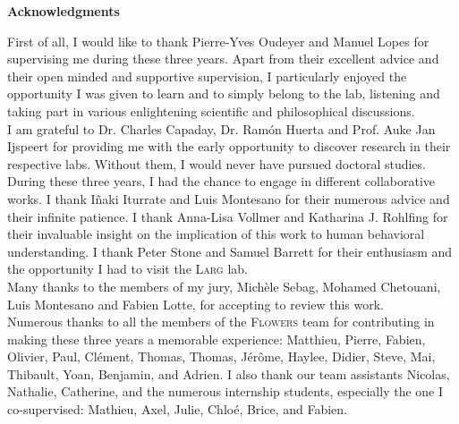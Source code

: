 
\begin{vcenterpage}
\begin{center}
{\large\textbf{Acknowledgments\\}}
\end{center}



\noindent First of all, I would like to thank Pierre-Yves Oudeyer and Manuel Lopes for supervising me during these three years. Apart from their excellent advice and their open minded and supportive supervision, I particularly enjoyed the opportunity I was given to learn and to simply belong to the lab, listening and taking part in various enlightening scientific and philosophical discussions.\\

\noindent I am grateful to Dr. Charles Capaday, Dr. Ram\'{o}n Huerta and Prof. Auke Jan Ijspeert for providing me with the early opportunity to discover research in their respective labs. Without them, I would never have pursued doctoral studies.\\

\noindent During these three years, I had the chance to engage in different collaborative works. I thank I{\~n}aki Iturrate and Luis Montesano for their numerous advice and their infinite patience. I thank Anna-Lisa Vollmer and Katharina J. Rohlfing for their invaluable insight on the implication of this work to human behavioral understanding. I thank Peter Stone and Samuel Barrett for their enthusiasm and the opportunity I had to visit the \textsc{Larg} lab.\\

\noindent Many thanks to the members of my jury, Mich\`ele Sebag, Mohamed Chetouani, Luis Montesano and Fabien Lotte, for accepting to review this work. \\


\noindent Numerous thanks to all the members of the \textsc{Flowers} team for contributing in making these three years a memorable experience: Matthieu, Pierre, Fabien, Olivier, Paul, Cl\'{e}ment, Thomas, Thomas, J\'{e}r\^{o}me, Haylee, Didier, Steve,  Mai, Thibault, Yoan, Benjamin, and Adrien. I also thank our team assistants Nicolas, Nathalie, Catherine, and the numerous internship students, especially the one I co-supervised: Mathieu, Axel, Julie, Chlo\'{e}, Brice, and Fabien.\\


\end{vcenterpage}
